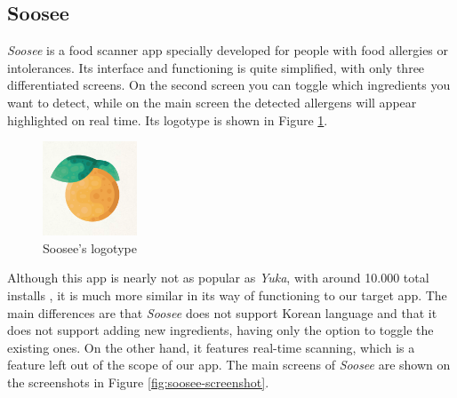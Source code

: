 \subsection{Soosee}

\textit{Soosee} \cite{noauthor_soosee_nodate-1} is a food scanner app specially developed for people with food allergies or intolerances. Its interface and functioning is quite simplified, with only three differentiated screens. On the second screen you can toggle which ingredients you want to detect, while on the main screen the detected allergens will appear highlighted on real time. Its logotype is shown in Figure \ref{fig:soosee}.

\begin{figure}[h]
  \centering
  \includegraphics[width=0.25\textwidth]{Figures/soosee.png}
  \caption{%
    Soosee's logotype
  }
  \label{fig:soosee}
\end{figure}

Although this app is nearly not as popular as \textit{Yuka}, with around 10.000 total installs \cite{noauthor_soosee_nodate}, it is much more similar in its way of functioning to our target app. The main differences are that \textit{Soosee} does not support Korean language and that it does not support adding new ingredients, having only the option to toggle the existing ones. On the other hand, it features real-time scanning, which is a feature left out of the scope of our app. The main screens of \textit{Soosee} are shown on the screenshots in Figure \ref{fig:soosee-screenshot}.

